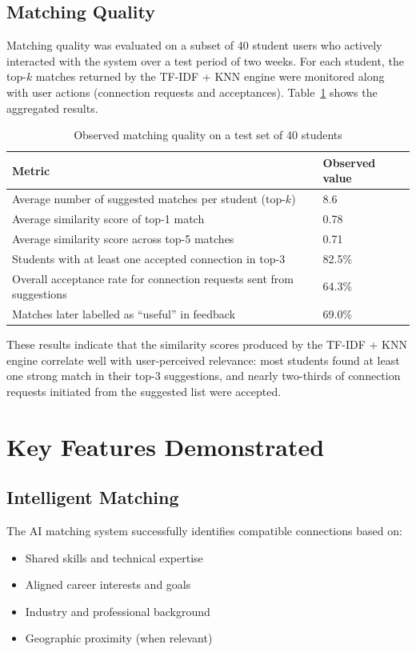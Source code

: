 \documentclass[12pt,a4paper]{report}
\let\origsection\section
\renewcommand{\section}{\needspace{4\baselineskip}\origsection}
\let\origsubsection\subsection
\renewcommand{\subsection}{\needspace{4\baselineskip}\origsubsection}
\begin{document}
\subsection{Matching Quality}

Matching quality was evaluated on a subset of 40 student users who actively interacted with the system over a test period of two weeks. For each student, the top-$k$ matches returned by the TF-IDF + KNN engine were monitored along with user actions (connection requests and acceptances). Table~\ref{tab:match-quality} shows the aggregated results.

\begin{table}[h!]
\centering
\caption{Observed matching quality on a test set of 40 students}
\label{tab:match-quality}
\begin{tabular}{p{6cm}p{6cm}}
\toprule
\textbf{Metric} & \textbf{Observed value} \\
\midrule
Average number of suggested matches per student (top-$k$) & 8.6 \\
Average similarity score of top-1 match & 0.78 \\
Average similarity score across top-5 matches & 0.71 \\
Students with at least one accepted connection in top-3 & 82.5\% \\
Overall acceptance rate for connection requests sent from suggestions & 64.3\% \\
Matches later labelled as ``useful'' in feedback & 69.0\% \\
\bottomrule
\end{tabular}
\end{table}

These results indicate that the similarity scores produced by the TF-IDF + KNN engine correlate well with user-perceived relevance: most students found at least one strong match in their top-3 suggestions, and nearly two-thirds of connection requests initiated from the suggested list were accepted.

\section{Key Features Demonstrated}

\subsection{Intelligent Matching}

The AI matching system successfully identifies compatible connections based on:
\begin{itemize}[noitemsep]
    \item Shared skills and technical expertise
    \item Aligned career interests and goals
    \item Industry and professional background
    \item Geographic proximity (when relevant)
\end{itemize}
\end{document}
